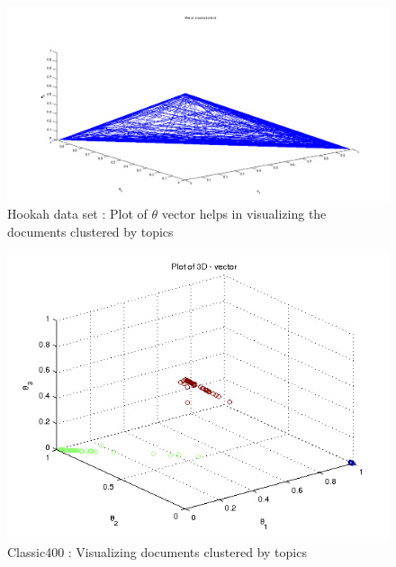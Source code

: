 \documentclass[11pt,a4paper,oneside]{article}
\begin{document}
\begin{figure}[H]
\centering
\includegraphics[width=\columnwidth]{triangle_hookah}
\caption{Hookah data set : Plot of $\theta$ vector helps in visualizing the documents clustered by topics}
\label{fig:triangle_hookah}
\end{figure}

\begin{figure}[H]
\centering
\includegraphics[width=\columnwidth]{scatter_classic400}
\caption{Classic400 : Visualizing documents clustered by topics}
\label{fig:scatter_classic400}
\end{figure}
\end{document}
